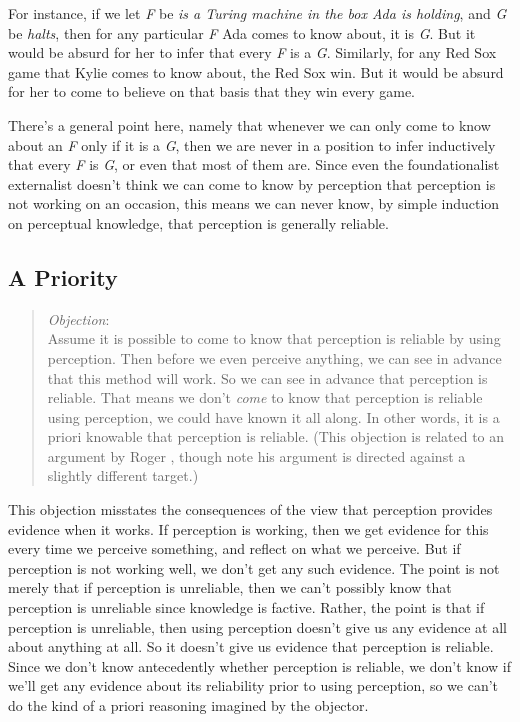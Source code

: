 For instance, if we let \emph{F} be \emph{is a Turing machine in the box Ada is holding}, and \emph{G} be \emph{halts}, then for any particular \emph{F} \gls{Ada} comes to know about, it is \emph{G}. But it would be absurd for her to infer that every \emph{F} is a \emph{G}. Similarly, for any Red Sox game that \gls{Kylie} comes to know about, the Red Sox win. But it would be absurd for her to come to believe on that basis that they win every game.

There's a general point here, namely that whenever we can only come to know about an \emph{F} only if it is a \emph{G}, then we are never in a position to infer inductively that every \emph{F} is \emph{G}, or even that most of them are. Since even the foundationalist externalist doesn't think we can come to know by perception that perception is not working on an occasion, this means we can never know, by simple induction on perceptual knowledge, that perception is generally reliable.

\subsection{A Priority}
\label{apriority}

\begin{quote}
\emph{Objection}:\\
Assume it is possible to come to know that perception is reliable by using perception. Then before we even perceive anything, we can see in advance that this method will work. So we can see in advance that perception is reliable. That means we don't \emph{come} to know that perception is reliable using perception, we could have known it all along. In other words, it is a priori knowable that perception is reliable. (This objection is related to an argument by Roger \citet{White2006}, though note his argument is directed against a slightly different target.)
\end{quote}
This objection misstates the consequences of the view that perception provides evidence when it works. If perception is working, then we get evidence for this every time we perceive something, and reflect on what we perceive. But if perception is not working well, we don't get any such evidence. The point is not merely that if perception is unreliable, then we can't possibly know that perception is unreliable since knowledge is factive. Rather, the point is that if perception is unreliable, then using perception doesn't give us any evidence at all about anything at all. So it doesn't give us evidence that perception is reliable. Since we don't know antecedently whether perception is reliable, we don't know if we'll get any evidence about its reliability prior to using perception, so we can't do the kind of a priori reasoning imagined by the objector.

